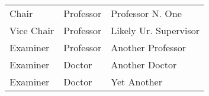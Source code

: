 \begin{table} [h!]
\large
\centering
\begin{tabular}{lll}\vspace{.2cm}
Chair      & Professor & Professor N. One \\ \vspace{.2cm}
Vice Chair & Professor & Likely Ur. Supervisor \\ \vspace{.2cm}
Examiner   & Professor & Another Professor\\ \vspace{.2cm}
Examiner   & Doctor & Another Doctor\\ \vspace{.2cm}
Examiner   & Doctor & Yet Another\\
\end{tabular}
\end{table}
\clearpage